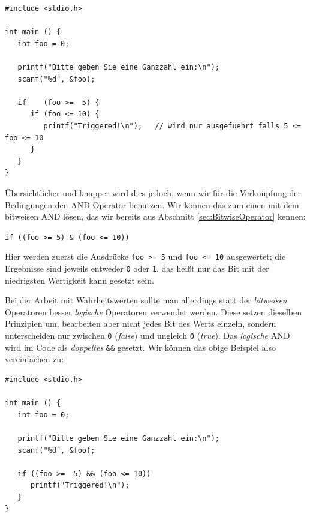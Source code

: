 \begin{codebox}
\begin{verbatim}
#include <stdio.h>

int main () {
   int foo = 0;

   printf("Bitte geben Sie eine Ganzzahl ein:\n");
   scanf("%d", &foo);

   if    (foo >=  5) {
      if (foo <= 10) {
         printf("Triggered!\n");   // wird nur ausgefuehrt falls 5 <= foo <= 10
      }
   }
}
\end{verbatim}
\end{codebox}

Übersichtlicher und knapper wird dies jedoch, wenn wir für die Verknüpfung der Bedingungen den AND-Operator benutzen. Wir können das zum einen mit dem bitweisen AND lösen, das wir bereits aus Abschnitt \ref{sec:BitwiseOperator} kennen:
\begin{center}
\texttt{if ((foo >=  5) & (foo <= 10))}
\end{center}

Hier werden zuerst die Ausdrücke \texttt{foo >= 5} und \texttt{foo <= 10} ausgewertet; die Ergebnisse sind jeweils entweder \texttt{0} oder \texttt{1}, das heißt nur das Bit mit der niedrigsten Wertigkeit kann gesetzt sein.

Bei der Arbeit mit Wahrheitswerten sollte man allerdings statt der \emph{bitweisen} Operatoren besser \emph{logische} Operatoren verwendet werden. Diese setzen dieselben Prinzipien um, bearbeiten aber nicht jedes Bit des Werts einzeln, sondern unterscheiden nur zwischen \texttt{0} (\emph{false}) und ungleich \texttt{0} (\emph{true}). Das \emph{logische} AND wird im Code als \emph{doppeltes} \texttt{\&\&} gesetzt. Wir können das obige Beispiel also vereinfachen zu:

\begin{codebox}
\begin{verbatim}
#include <stdio.h>

int main () {
   int foo = 0;

   printf("Bitte geben Sie eine Ganzzahl ein:\n");
   scanf("%d", &foo);

   if ((foo >=  5) && (foo <= 10))
      printf("Triggered!\n");
   }
}
\end{verbatim}
\end{codebox}

